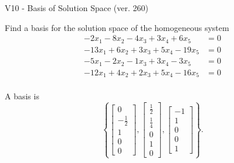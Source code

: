 \begin{exercise}
  \begin{exerciseTitle}V10 - Basis of Solution Space (ver. 260)\end{exerciseTitle}
  \begin{exerciseStatement}
    Find a basis for the solution space of the homogeneous system 
\begin{align*}
 -2 x_ 1 -8 x_ 2 -4 x_ 3 + 3 x_ 4 + 6 x_ 5 &= 0  \\ 
  -13 x_ 1 + 6 x_ 2 + 3 x_ 3 + 5 x_ 4 -19 x_ 5 &= 0  \\ 
  -5 x_ 1 -2 x_ 2 -1 x_ 3 + 3 x_ 4 -3 x_ 5 &= 0  \\ 
  -12 x_ 1 + 4 x_ 2 + 2 x_ 3 + 5 x_ 4 -16 x_ 5 &= 0  \\ 
 \end{align*}


 
  \end{exerciseStatement}

  \begin{exerciseAnswer}
   A basis is   
\[\left\{\left[\begin{array}{c}
0 \\
-\frac{1}{2} \\
1 \\
0 \\
0
\end{array}\right] , \left[\begin{array}{c}
\frac{1}{2} \\
\frac{1}{4} \\
0 \\
1 \\
0
\end{array}\right] , \left[\begin{array}{c}
-1 \\
1 \\
0 \\
0 \\
1
\end{array}\right]\right\}.\]

  


  \end{exerciseAnswer}
\end{exercise}